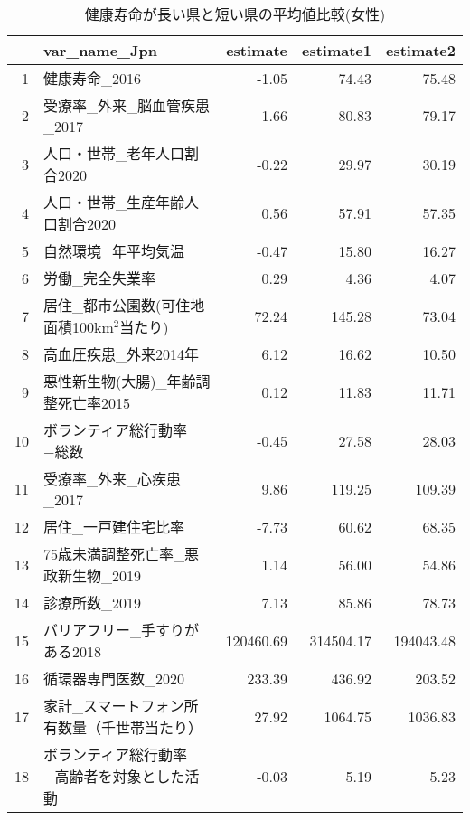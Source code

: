 \begin{table}[ht]
\centering
\caption{健康寿命が長い県と短い県の平均値比較(女性)}
\label{HLE_Ttest_d_f.tex}
\begingroup\tiny

\begin{adjustbox}{width=.7\textwidth}
\begin{tabular}{rlrrr}
  \hline
 & var\_name\_Jpn & estimate & estimate1 & estimate2 \\
  \hline
1 & 健康寿命\_2016 & -1.05 & 74.43 & 75.48 \\
  2 & 受療率\_外来\_脳血管疾患\_2017 & 1.66 & 80.83 & 79.17 \\
  3 & 人口・世帯\_老年人口割合2020 & -0.22 & 29.97 & 30.19 \\
  4 & 人口・世帯\_生産年齢人口割合2020 & 0.56 & 57.91 & 57.35 \\
  5 & 自然環境\_年平均気温 & -0.47 & 15.80 & 16.27 \\
  6 & 労働\_完全失業率 & 0.29 & 4.36 & 4.07 \\
  7 & 居住\_都市公園数(可住地面積100km$^2$当たり) & 72.24 & 145.28 & 73.04 \\
  8 & 高血圧疾患\_外来2014年 & 6.12 & 16.62 & 10.50 \\
  9 & 悪性新生物(大腸)\_年齢調整死亡率2015 & 0.12 & 11.83 & 11.71 \\
  10 & ボランティア総行動率−総数 & -0.45 & 27.58 & 28.03 \\
  11 & 受療率\_外来\_心疾患\_2017 & 9.86 & 119.25 & 109.39 \\
  12 & 居住\_一戸建住宅比率 & -7.73 & 60.62 & 68.35 \\
  13 & 75歳未満調整死亡率\_悪政新生物\_2019 & 1.14 & 56.00 & 54.86 \\
  14 & 診療所数\_2019 & 7.13 & 85.86 & 78.73 \\
  15 & バリアフリー\_手すりがある2018 & 120460.69 & 314504.17 & 194043.48 \\
  16 & 循環器専門医数\_2020 & 233.39 & 436.92 & 203.52 \\
  17 & 家計\_スマートフォン所有数量（千世帯当たり） & 27.92 & 1064.75 & 1036.83 \\
  18 & ボランティア総行動率−高齢者を対象とした活動 & -0.03 & 5.19 & 5.23 \\
   \hline
\end{tabular}
\end{adjustbox}

\endgroup
\end{table}
